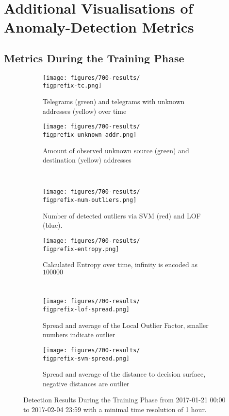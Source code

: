 \chapter{Additional Visualisations of Anomaly-Detection Metrics}
\label{app:metrics}
\clearpage

\section{Metrics During the Training Phase}
\label{app:metrics:training}

\begin{figure}[H]
	\newcommand{\figwith}{0.49\textwidth}
	\newcommand{\figprefix}{train}
	\centering
	
	\begin{subfigure}[b]{\figwith}
		\texttt{[image: figures/700-results/\\figprefix-tc.png]}
		\caption{Telegrams (green) and telegrams with unknown addresses (yellow) over time}
		\label{fig:results:\figprefix:tc}
	\end{subfigure}
	\hfil
	\begin{subfigure}[b]{\figwith}
		\texttt{[image: figures/700-results/\\figprefix-unknown-addr.png]}
		\caption{Amount of observed unknown source (green) and destination (yellow) addresses}
		\label{fig:results:\figprefix:addr}
	\end{subfigure}
	\\[1.5mm]
	\begin{subfigure}[b]{\figwith}
		\texttt{[image: figures/700-results/\\figprefix-num-outliers.png]}
		\caption{Number of detected outliers via SVM (red) and LOF (blue).}
		\label{fig:results:\figprefix:outlier}
	\end{subfigure}
	\hfil
	\begin{subfigure}[b]{\figwith}
		\texttt{[image: figures/700-results/\\figprefix-entropy.png]}
		\caption{Calculated Entropy over time, infinity is encoded as $100 000$}
		\label{fig:results:\figprefix:entropy}
	\end{subfigure}
	\\[1.5mm]
	\begin{subfigure}[b]{\figwith}
		\texttt{[image: figures/700-results/\\figprefix-lof-spread.png]}
		\caption{Spread and average of the Local Outlier Factor, smaller numbers indicate outlier}
		\label{fig:results:\figprefix:lof}
	\end{subfigure}
	\hfil
	\begin{subfigure}[b]{\figwith}
		\texttt{[image: figures/700-results/\\figprefix-svm-spread.png]}
		\caption{Spread and average of the distance to decision surface, negative distances are outlier}
		\label{fig:results:\figprefix:svm}
	\end{subfigure}
	
	\caption[Detection Results During the Training Phase]{Detection Results During the Training Phase from 2017-01-21 00:00 to 2017-02-04 23:59 with a minimal time resolution of 1 hour.}
	\label{fig:results:\figprefix}
	
\end{figure}

